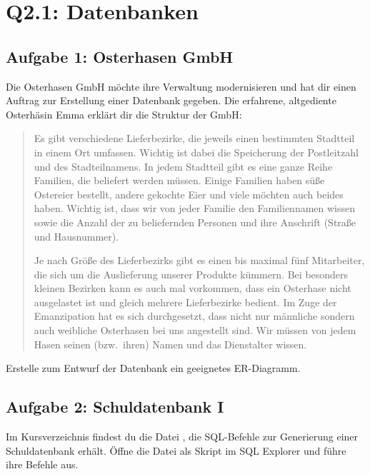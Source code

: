 \section{Q2.1: Datenbanken}

\subsection{Aufgabe 1: Osterhasen GmbH}

Die Osterhasen GmbH möchte ihre Verwaltung modernisieren und hat dir einen
Auftrag zur Erstellung einer Datenbank gegeben. Die erfahrene, altgediente
Osterhäsin Emma erklärt dir die Struktur der GmbH:

\begin{quotation}
\noindent
Es gibt verschiedene Lieferbezirke, die jeweils einen bestimmten Stadtteil in
einem Ort umfassen. Wichtig ist dabei die Speicherung der Postleitzahl und des
Stadteilnamens. In jedem Stadtteil gibt es eine ganze Reihe Familien, die
beliefert werden müssen. Einige Familien haben süße Ostereier bestellt, andere
gekochte Eier und viele möchten auch beides haben. Wichtig ist, dass wir von
jeder Familie den Familiennamen wissen sowie die Anzahl der zu beliefernden
Personen und ihre Anschrift (Straße und Hausnummer).

\noindent
Je nach Größe des Lieferbezirks gibt es einen bis maximal fünf Mitarbeiter, die
sich um die Auslieferung unserer Produkte kümmern. Bei besonders kleinen
Bezirken kann es auch mal vorkommen, dass ein Osterhase nicht ausgelastet ist
und gleich mehrere Lieferbezirke bedient. Im Zuge der Emanzipation hat es sich
durchgesetzt, dass nicht nur männliche sondern auch weibliche Osterhasen bei
uns angestellt sind. Wir müssen von jedem Hasen seinen (bzw.\ ihren) Namen und
das Dienstalter wissen.
\end{quotation}

Erstelle zum Entwurf der Datenbank ein geeignetes ER-Diagramm.


\subsection{Aufgabe 2: Schuldatenbank I}

Im Kursverzeichnis findest du die Datei , die SQL-Befehle zur
Generierung einer Schuldatenbank erhält. Öffne die Datei als Skript im SQL
Explorer und führe ihre Befehle aus.

